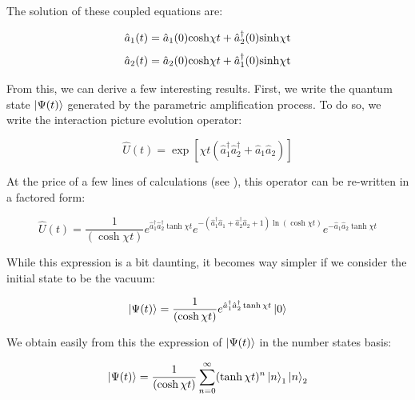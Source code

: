 \noindent The solution of these coupled equations are:

\begin{equation}
    \hat{a}_1(t)=\hat{a}_1(0) \mathrm{cosh} \chi t + \hat{a}_2^{\dagger}(0) \rm{sinh} \chi t
    \label{eq:a1}
\end{equation}
\begin{equation}
    \hat{a}_2(t)=\hat{a}_2(0) \mathrm{cosh} \chi t + \hat{a}_1^{\dagger}(0) \rm{sinh} \chi t
    \label{eq:a2}
\end{equation}

\noindent From this, we can derive a few interesting results. First, we write the quantum state $\ket{\Psi(t)}$ generated by the parametric amplification process. To do so, we write the interaction picture evolution operator:

\begin{equation}
    \hat{U}(t)=\exp \left[\chi t\left(\hat{a}_{1}^{\dagger} \hat{a}_{2}^{\dagger}+\hat{a}_{1} \hat{a}_{2}\right)\right]
\end{equation}

\noindent At the price of a few lines of calculations (see \cite{schumaker1985new}), this operator can be re-written in a factored form:

\begin{equation}
    \hat{U}(t)=\frac{1}{(\cosh \chi t)} e^{\hat{a}_{1}^{\dagger} \hat{a}_{2}^{\dagger} \tanh \chi t} e^{-\left(\hat{a}_{1}^{\dagger} \hat{a}_{1}+\hat{a}_{2}^{\dagger} \hat{a}_{2}+1\right) \ln (\cosh \chi t)} e^{-\hat{a}_{1} \hat{a}_{2} \tanh \chi t}
\end{equation}

\noindent While this expression is a bit daunting, it becomes way simpler if we consider the initial state to be the vacuum:

\begin{equation}
    \ket{\Psi(t)} = \frac{1}{(\cosh \chi t)} e^{\hat{a}_{1}^{\dagger} \hat{a}_{2}^{\dagger} \tanh \chi t} \ket{0}
\end{equation}

\noindent We obtain easily from this the expression of $\ket{\Psi(t)}$ in the number states basis:

\begin{equation}
    |\Psi(t)\rangle=\frac{1}{(\cosh \chi t)} \sum_{n=0}^{\infty}(\tanh \chi t)^{n} \ket{n}_1 \ket{n}_2
\end{equation}

\label{sec:correlated_pop}

